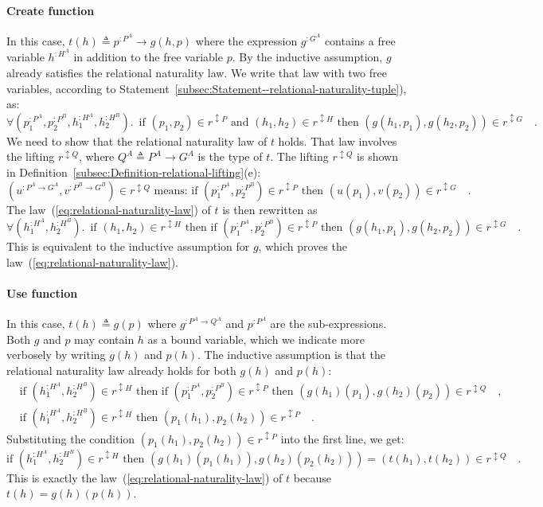 \paragraph{Create function}

In this case, $t(h)\triangleq p^{:P^{A}}\rightarrow g(h,p)$ where
the expression $g^{:G^{A}}$ contains a free variable $h^{:H^{A}}$
in addition to the free variable $p$. By the inductive assumption,
$g$ already satisfies the relational naturality law. We write that
law with two free variables, according to Statement~\ref{subsec:Statement--relational-naturality-tuple}),
as:
\[
\forall(p_{1}^{:P^{A}},p_{2}^{:P^{B}},h_{1}^{:H^{A}},h_{2}^{:H^{B}}).\,\text{ if }(p_{1},p_{2})\in r^{\updownarrow P}\text{ and }(h_{1},h_{2})\in r^{\updownarrow H}\text{ then }(g(h_{1},p_{1}),g(h_{2},p_{2}))\in r^{\updownarrow G}\quad.
\]
We need to show that the relational naturality law of $t$ holds.
That law involves the lifting $r^{\updownarrow Q}$, where $Q^{A}\triangleq P^{A}\rightarrow G^{A}$
is the type of $t$. The lifting $r^{\updownarrow Q}$ is shown in
Definition~\ref{subsec:Definition-relational-lifting}(e):
\[
(u^{:P^{A}\rightarrow G^{A}},v^{:P^{B}\rightarrow G^{B}})\in r^{\updownarrow Q}\text{ means: if }(p_{1}^{:P^{A}},p_{2}^{:P^{B}})\in r^{\updownarrow P}\text{ then }(u(p_{1}),v(p_{2}))\in r^{\updownarrow G}\quad.
\]
The law~(\ref{eq:relational-naturality-law}) of $t$ is then rewritten
as
\[
\forall(h_{1}^{:H^{A}},h_{2}^{:H^{B}}).\,\text{ if }(h_{1},h_{2})\in r^{\updownarrow H}\text{ then if }(p_{1}^{:P^{A}},p_{2}^{:P^{B}})\in r^{\updownarrow P}\text{ then }(g(h_{1},p_{1}),g(h_{2},p_{2}))\in r^{\updownarrow G}\quad.
\]
This is equivalent to the inductive assumption for $g$, which proves
the law~(\ref{eq:relational-naturality-law}).

\paragraph{Use function}

In this case, $t(h)\triangleq g(p)$ where $g^{:P^{A}\rightarrow Q^{A}}$
and $p^{:P^{A}}$ are the sub-expressions. Both $g$ and $p$ may
contain $h$ as a bound variable, which we indicate more verbosely
by writing $g(h)$ and $p(h)$. The inductive assumption is that the
relational naturality law already holds for both $g(h)$ and $p(h)$:
\begin{align*}
 & \text{if }(h_{1}^{:H^{A}},h_{2}^{:H^{B}})\in r^{\updownarrow H}\text{ then if }(p_{1}^{:P^{A}},p_{2}^{:P^{B}})\in r^{\updownarrow P}\text{ then }(g(h_{1})(p_{1}),g(h_{2})(p_{2}))\in r^{\updownarrow Q}\quad,\\
 & \text{if }(h_{1}^{:H^{A}},h_{2}^{:H^{B}})\in r^{\updownarrow H}\text{ then }(p_{1}(h_{1}),p_{2}(h_{2}))\in r^{\updownarrow P}\quad.
\end{align*}
Substituting the condition $(p_{1}(h_{1}),p_{2}(h_{2}))\in r^{\updownarrow P}$
into the first line, we get:
\[
\text{if }(h_{1}^{:H^{A}},h_{2}^{:H^{B}})\in r^{\updownarrow H}\text{ then }(g(h_{1})(p_{1}(h_{1})),g(h_{2})(p_{2}(h_{2})))=(t(h_{1}),t(h_{2}))\in r^{\updownarrow Q}\quad.
\]
This is exactly the law~(\ref{eq:relational-naturality-law}) of
$t$ because $t(h)=g(h)(p(h))$.


